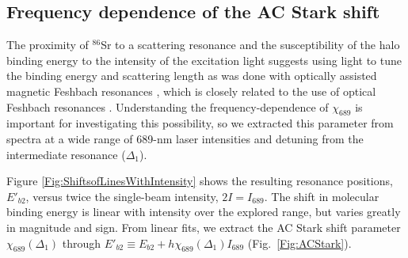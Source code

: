 %

\subsection{Frequency dependence of the AC Stark shift} \label{sec:numTheory}
The proximity of $^{86}$Sr to a scattering resonance and the susceptibility of the halo binding energy to the intensity of the excitation light suggests  using light to tune the binding energy and scattering length as was done with optically assisted magnetic Feshbach resonances \cite{blv09,chx15}, which is closely related to the use of optical Feshbach resonances \cite{Fedichev1996a,Theis2004,Yamazaki2010,Blatt,Yan2013c}. Understanding the frequency-dependence of $\chi_{689}$ is important for investigating this possibility, so we extracted this parameter from spectra at a wide range of 689-nm laser intensities and detuning from the intermediate resonance ($\Delta_1$).

Figure \ref{Fig:ShiftsofLinesWithIntensity} shows
the resulting resonance positions, $E'_{b2}$, versus twice the single-beam intensity, $2I=I_{689}$. The shift in molecular binding energy is linear with intensity over the explored range, but varies greatly in magnitude and sign. From linear fits, we extract the AC Stark shift parameter $\chi_{689}(\Delta_1)$ through $E'_{b2}\equiv E_{b2}+h\chi_{689}(\Delta_{1}) I_{689}$ (Fig.\ \ref{Fig:ACStark}).

